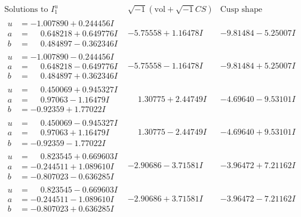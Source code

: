 \documentclass[1p]{elsarticle_modified}
\theoremstyle{definition}
\newcommand{\I}{\sqrt{-1}}
\begin{document}
$$\begin{array}{c|c|c}  
\text{Solutions to }I^u_{1}& \I (\text{vol} + \sqrt{-1}CS) & \text{Cusp shape}\\
 \hline 
\begin{aligned}
u &= -1.007890 + 0.244456 I \\
a &= \phantom{-}0.648218 + 0.649776 I \\
b &= \phantom{-}0.484897 - 0.362346 I\end{aligned}
 & -5.75558 + 1.16478 I & -9.81484 - 5.25007 I \\ \hline\begin{aligned}
u &= -1.007890 - 0.244456 I \\
a &= \phantom{-}0.648218 - 0.649776 I \\
b &= \phantom{-}0.484897 + 0.362346 I\end{aligned}
 & -5.75558 - 1.16478 I & -9.81484 + 5.25007 I \\ \hline\begin{aligned}
u &= \phantom{-}0.450069 + 0.945327 I \\
a &= \phantom{-}0.97063 - 1.16479 I \\
b &= -0.92359 + 1.77022 I\end{aligned}
 & \phantom{-}1.30775 + 2.44749 I & -4.69640 - 9.53101 I \\ \hline\begin{aligned}
u &= \phantom{-}0.450069 - 0.945327 I \\
a &= \phantom{-}0.97063 + 1.16479 I \\
b &= -0.92359 - 1.77022 I\end{aligned}
 & \phantom{-}1.30775 - 2.44749 I & -4.69640 + 9.53101 I \\ \hline\begin{aligned}
u &= \phantom{-}0.823545 + 0.669603 I \\
a &= -0.244511 + 1.089610 I \\
b &= -0.807023 - 0.636285 I\end{aligned}
 & -2.90686 - 3.71581 I & -3.96472 + 7.21162 I \\ \hline\begin{aligned}
u &= \phantom{-}0.823545 - 0.669603 I \\
a &= -0.244511 - 1.089610 I \\
b &= -0.807023 + 0.636285 I\end{aligned}
 & -2.90686 + 3.71581 I & -3.96472 - 7.21162 I \\ \hline\begin{aligned}

\end{aligned}
\end{array}$$
\end{document}
